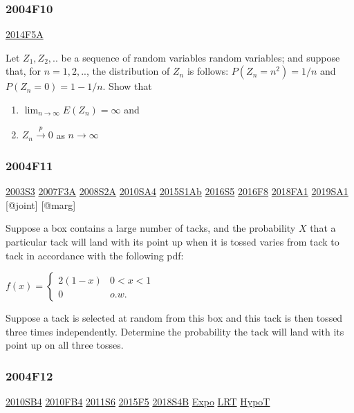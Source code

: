 \documentclass[10pt,twocolumn,portrait]{article}
\begin{document}
\hypertarget{f10}{%
\subsubsection{2004F10}\label{f10}}

\protect\hyperlink{f5a-1}{2014F5A}

Let \(Z_1,Z_2,..\) be a sequence of random variables random variables;
and suppose that, for \(n=1,2,..\), the distribution of \(Z_n\) is
follows: \(P(Z_n=n^2)=1/n\) and \(P(Z_n=0)=1-1/n\). Show that

\begin{enumerate}
\def\labelenumi{(\alph{enumi})}
\item
  \(\lim_{n\to\infty}E(Z_n)=\infty\) and
\item
  \(Z_n\overset{p}\to0\) as \(n\to\infty\)
\end{enumerate}

\hypertarget{f11}{%
\subsubsection{2004F11}\label{f11}}

\protect\hyperlink{s3}{2003S3} \protect\hyperlink{f3a}{2007F3A}
\protect\hyperlink{s2a}{2008S2A} \protect\hyperlink{sa4-1}{2010SA4}
\protect\hyperlink{s1ab}{2015S1Ab} \protect\hyperlink{s5-4}{2016S5}
\protect\hyperlink{f8-4}{2016F8} \protect\hyperlink{fa1-4}{2018FA1}
\protect\hyperlink{sa1-3}{2019SA1} {[}@joint{]} {[}@marg{]}

Suppose a box contains a large number of tacks, and the probability
\(X\) that a particular tack will land with its point up when it is
tossed varies from tack to tack in accordance with the following pdf:

\(f(x)=\begin{cases}2(1-x)&0<x<1\\0& o.w.\end{cases}\)

Suppose a tack is selected at random from this box and this tack is then
tossed three times independently. Determine the probability the tack
will land with its point up on all three tosses.

\hypertarget{f12}{%
\subsubsection{2004F12}\label{f12}}

\protect\hyperlink{sb4}{2010SB4} \protect\hyperlink{fb4-1}{2010FB4}
\protect\hyperlink{s6-2}{2011S6} \protect\hyperlink{f5-5}{2015F5}
\protect\hyperlink{s4b-2}{2018S4B} \protect\hyperlink{Expo}{Expo}
\protect\hyperlink{LRT}{LRT} \protect\hyperlink{HypoT}{HypoT}
\end{document}
